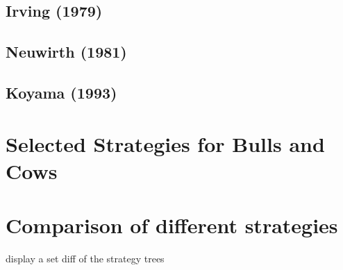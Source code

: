 \subsection{Irving (1979)}

\subsection{Neuwirth (1981)}

\subsection{Koyama (1993)}


\section{Selected Strategies for Bulls and Cows}

\section{Comparison of different strategies}

display a set diff of the strategy trees